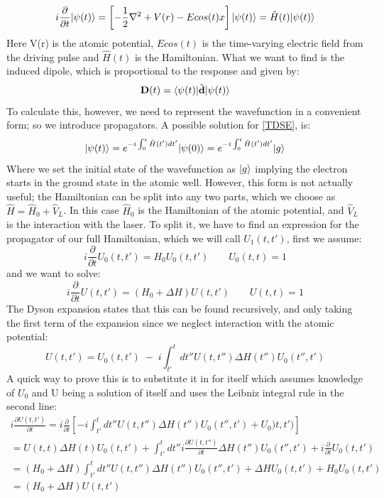 \documentclass[11pt,a4paper]{report}
\DeclarePairedDelimiter\bra{\langle}{\rvert}
\DeclarePairedDelimiter\ket{\lvert}{\rangle}
\begin{document}
\begin{equation} 
	i\frac{\partial}{\partial t} \ket{\psi(t)} = \left[-\frac{1}{2} \nabla^2 + V(r) - Ecos(t)x\right] \ket{\psi(t)} = \hat{H}(t) \ket{\psi(t)}
	\label{TDSE}
\end{equation}
Here V(r) is the atomic potential, $Ecos(t)$ is the time-varying electric field from the driving pulse and $\hat{H}(t)$ is the Hamiltonian. What we want to find is the induced dipole, which is proportional to the response and given by:
\begin{equation}
\mathbf{D}(t) = \bra{\psi(t)}\hat{\mathbf{d}}\ket{\psi(t)}
\end{equation}
To calculate this, however, we need to represent the wavefunction in a convenient form; so we introduce propagators. A possible solution for \eqref{TDSE}, is:
\begin{equation}
\ket{\psi(t)} = e^{-i\int_{0}^{t} \hat{H}(t')dt'}\ket{\psi(0)} = e^{-i\int_{0}^{t} \hat{H}(t')dt'} \ket{g}
\end{equation}
Where we set the initial state of the wavefunction as $\ket{g}$ implying the electron starts in the ground state in the atomic well. However, this form is not actually useful; the Hamiltonian can be split into any two parts, which we choose as $\hat{H} = \hat{H}_0 + \hat{V}_L$. In this case $\hat{H}_0$ is the Hamiltonian of the atomic potential, and $\hat{V}_L$ is the interaction with the laser. To split it, we have to find an expression for the propagator of our full Hamiltonian, which we will call $U_1(t,t')$, first we assume:
\begin{equation}
i\frac{\partial}{\partial t}	U_0(t,t') = H_0 U_0(t,t') \qquad U_0(t,t) = 1
\end{equation}
and we want to solve:
\begin{equation}
i\frac{\partial}{\partial t}	U(t,t') = (H_0 + \Delta H)U(t,t') \qquad U(t,t) = 1
\end{equation}
The Dyson expansion states that this can be found recursively, and only taking the first term of the expansion since we neglect interaction with the atomic potential:
\begin{equation}
U(t,t') = U_0(t,t') \; -\; i\int^{t}_{t'} dt'' U(t,t'')\Delta H(t'') U_0(t'',t')
\end{equation}
A quick way to prove this is to substitute it in for itself which assumes knowledge of $U_0$ and U being a solution of itself and uses the Leibniz integral rule in the second line:
\begin{equation}
\begin{split}
i \frac{\partial U(t,t')}{\partial t} = i \frac{\partial}{\partial t} \left[-i \int^{t}_{t'} dt'' U(t,t'')\Delta H(t'') U_0(t'',t') + U_0)t,t')\right] \\
=U(t,t)\Delta H(t) U_0(t,t') + \int^{t}_{t'} dt'' i\frac{\partial U(t,t'')}{\partial t} \Delta H (t'') U_0(t'',t') + i\frac{\partial}{\partial t} U_0(t,t') \\
 = (H_0  + \Delta H) \int^{t}_{t'} dt'' U(t,t'')\Delta H (t'') U_0(t'',t') + \Delta H U_0(t,t') + H_0U_0(t,t') \\
= (H_0 + \Delta H )U(t,t')
\end{split}
\end{equation}
\end{document}
